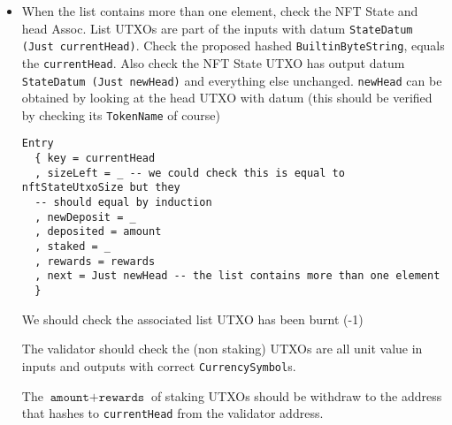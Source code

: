 \documentclass[10pt, a4paper]{article}
\theoremstyle{definition}
\begin{document}
\begin{enumerate}
{\begin{itemize}
\item{
When the list contains more than one element, check the NFT State and head Assoc. List UTXOs are part of the inputs with datum \texttt{StateDatum (Just currentHead)}. Check the proposed hashed \texttt{BuiltinByteString}, equals the \texttt{currentHead}. Also check the NFT State UTXO has output datum \texttt{StateDatum (Just newHead)} and everything else unchanged. \texttt{newHead} can be obtained by looking at the head UTXO with datum (this should be verified by checking its \texttt{TokenName} of course)
\begin{verbatim}
Entry
  { key = currentHead
  , sizeLeft = _ -- we could check this is equal to nftStateUtxoSize but they
  -- should equal by induction
  , newDeposit = _
  , deposited = amount
  , staked = _
  , rewards = rewards 
  , next = Just newHead -- the list contains more than one element
  }
\end{verbatim}


 We should check the associated list UTXO has been burnt (-1)

The validator should check the (non staking) UTXOs are all unit value in inputs and outputs with correct \texttt{CurrencySymbol}s.

The $\texttt{amount} + \texttt{rewards}$ of staking UTXOs should be withdraw to the address that hashes to \texttt{currentHead} from the validator address.
}

\end{itemize} 

}
\end{enumerate}
\end{document}
